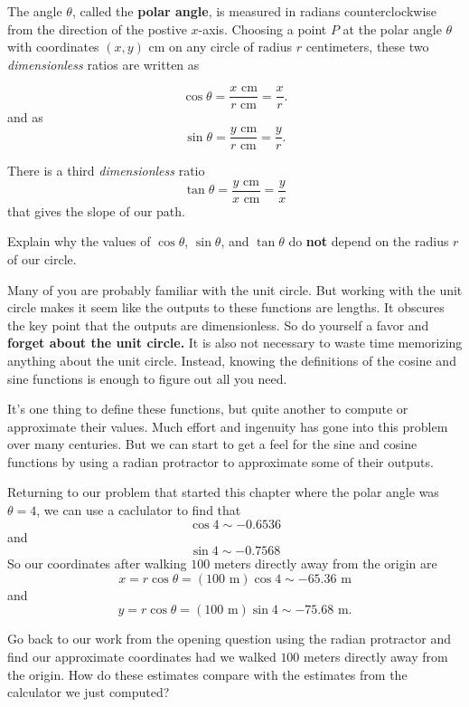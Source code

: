 \documentclass{ximera}
\begin{document}
\begin{question}
The angle $\theta$, called the {\bf polar angle}, is measured in radians counterclockwise from the direction of the postive $x$-axis. Choosing a point $P$ at the polar angle $\theta$ with coordinates $(x,y)$ cm on any circle of radius $r$ centimeters, these two \emph{dimensionless} ratios are written as

\[
   \cos \theta = \frac{x \text{ cm}}{r \text{ cm}} = \frac{x}{r} .
\]
and as
\[
   \sin \theta = \frac{y \text{ cm}}{r \text{ cm}} = \frac{y}{r} .
\]

There is a third \emph{dimensionless} ratio 
\[
  \tan \theta = \frac{y \text{ cm}}{x \text{ cm}} = \frac{y}{x}
\]
that gives the slope of our path. 


\end{question}



\begin{question} \label{Q1:Cosine}
Explain why the values of $\cos \theta$, $\sin\theta$, and $\tan\theta$ do {\bf not} depend on the radius $r$ of our circle. 
\end{question}



Many of you are probably familiar with the unit circle. But working with the unit circle makes it seem like the outputs to these functions are lengths. It obscures the key point that the outputs are dimensionless. So do yourself a favor and {\bf forget about the unit circle.} It is also not necessary to waste time memorizing anything about the unit circle. Instead, knowing the definitions of the cosine and sine functions is enough to figure out all you need.

It's one thing to define these functions, but quite another to compute or approximate their values. Much effort and ingenuity has gone into this problem over many centuries. But we can start to get a feel for the sine and cosine functions by using a radian protractor to approximate some of their outputs.

Returning to our problem that started this chapter where the polar angle was $\theta=4$, we can use a caclulator to find that
\[
  \cos 4 \sim -0.6536
\]
and
\[
   \sin 4 \sim -0.7568
\]
So our coordinates after walking $100$ meters directly away from the origin are 
\[
     x = r\cos \theta = (100 \text{ m})\cos 4 \sim -65.36\text{ m}
\]
and
\[
     y = r\cos \theta = (100 \text{ m})\sin 4 \sim -75.68\text{ m} .
\]

\begin{question}  \label{QWEREWR:Cosine}
Go back to our work from the opening question using the radian protractor and find our approximate coordinates had we walked $100$ meters directly away from the origin. How do these estimates compare with the estimates from the calculator we just computed?
\end{question}
\end{document}
